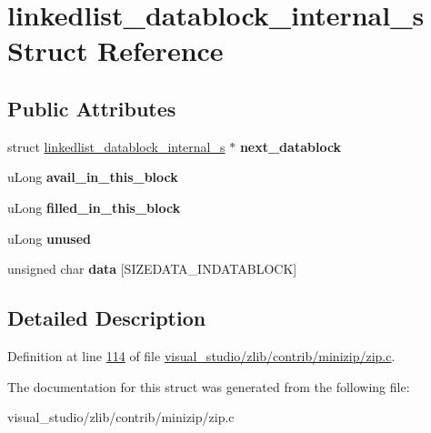 \hypertarget{structlinkedlist__datablock__internal__s}{}\section{linkedlist\+\_\+datablock\+\_\+internal\+\_\+s Struct Reference}
\label{structlinkedlist__datablock__internal__s}
\subsection*{Public Attributes}
\begin{DoxyCompactItemize}
\item 
\mbox{\label{structlinkedlist__datablock__internal__s_a8c6f5eecdfcb0b07e7a72ebee34c8f0c}} 
struct \hyperlink{structlinkedlist__datablock__internal__s}{linkedlist\+\_\+datablock\+\_\+internal\+\_\+s} $\ast$ {\bfseries next\+\_\+datablock}
\item 
\mbox{\label{structlinkedlist__datablock__internal__s_a1d63f75d88f05ee665221ccf618a57ed}} 
u\+Long {\bfseries avail\+\_\+in\+\_\+this\+\_\+block}
\item 
\mbox{\label{structlinkedlist__datablock__internal__s_a76ae854b6029e6617c7544d2eb311f77}} 
u\+Long {\bfseries filled\+\_\+in\+\_\+this\+\_\+block}
\item 
\mbox{\label{structlinkedlist__datablock__internal__s_ae7275ad9d24cbe4f4c062f29abfb3b91}} 
u\+Long {\bfseries unused}
\item 
\mbox{\label{structlinkedlist__datablock__internal__s_a7731afc22c3a94b3e524343d8593ce7f}} 
unsigned char {\bfseries data} \mbox{[}S\+I\+Z\+E\+D\+A\+T\+A\+\_\+\+I\+N\+D\+A\+T\+A\+B\+L\+O\+CK\mbox{]}
\end{DoxyCompactItemize}


\subsection{Detailed Description}


Definition at line \hyperlink{visual__studio_2zlib_2contrib_2minizip_2zip_8c_source_l00114}{114} of file \hyperlink{visual__studio_2zlib_2contrib_2minizip_2zip_8c_source}{visual\+\_\+studio/zlib/contrib/minizip/zip.\+c}.



The documentation for this struct was generated from the following file\+:\begin{DoxyCompactItemize}
\item 
visual\+\_\+studio/zlib/contrib/minizip/zip.\+c\end{DoxyCompactItemize}
